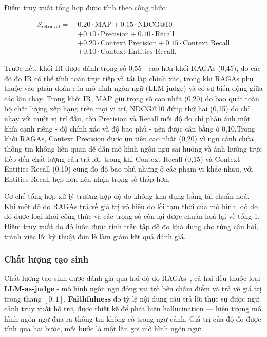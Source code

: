 Điểm truy xuất tổng hợp được tính theo công thức:

\begin{equation}
\begin{aligned}
S_{\text{retrieval}} =\;& 0.20 \cdot \text{MAP}
  + 0.15 \cdot \text{NDCG@10} \\
& + 0.10 \cdot \text{Precision}
  + 0.10 \cdot \text{Recall} \\
& + 0.20 \cdot \text{Context Precision}
  + 0.15 \cdot \text{Context Recall} \\
& + 0.10 \cdot \text{Context Entities Recall}.
\end{aligned}
\end{equation}

Trước hết, khối IR được đánh trọng số 0,55 - cao hơn khối RAGAs (0,45), do các độ đo IR có thể tính toán trực tiếp và tái lập chính xác, trong khi RAGAs phụ thuộc vào phán đoán của mô hình ngôn ngữ (LLM-judge) và có sự biến động giữa các lần chạy. Trong khối IR, MAP giữ trọng số cao nhất (0,20) do bao quát toàn bộ chất lượng xếp hạng trên mọi vị trí, NDCG@10 đứng thứ hai (0,15) do chỉ nhạy với mười vị trí đầu, còn Precision và Recall mỗi độ đo chỉ phản ánh một khía cạnh riêng - độ chính xác và độ bao phủ - nên được cân bằng ở 0,10.Trong khối RAGAs, Context Precision được ưu tiên cao nhất (0,20) vì ngữ cảnh chứa thông tin không liên quan dễ dẫn mô hình ngôn ngữ sai hướng và ảnh hưởng trực tiếp đến chất lượng câu trả lời, trong khi Context Recall (0,15) và Context Entities Recall (0,10) cùng đo độ bao phủ nhưng ở các phạm vi khác nhau, với Entities Recall hẹp hơn nên nhận trọng số thấp hơn.

Cơ chế tổng hợp xử lý trường hợp độ đo không khả dụng bằng tái chuẩn hoá. Khi một độ đo RAGAs trả về giá trị vô hiệu do lỗi tạm thời của mô hình, độ đo đó được loại khỏi công thức và các trọng số còn lại được chuẩn hoá lại về tổng 1. Điểm truy xuất do đó luôn được tính trên tập độ đo khả dụng cho từng câu hỏi, tránh việc lỗi kỹ thuật đơn lẻ làm giảm kết quả đánh giá.

\subsubsection{Chất lượng tạo sinh}

Chất lượng tạo sinh được đánh giá qua hai độ đo RAGAs~\cite{es2023ragas}, cả hai đều thuộc loại \textbf{LLM-as-judge} - mô hình ngôn ngữ đóng vai trò bên chấm điểm và trả về giá trị trong thang $[0, 1]$. \textbf{Faithfulness} đo tỷ lệ nội dung câu trả lời thực sự được ngữ cảnh truy xuất hỗ trợ, được thiết kế để phát hiện hallucination --- hiện tượng mô hình ngôn ngữ đưa ra thông tin không có trong ngữ cảnh. Giá trị của độ đo được tính qua hai bước, mỗi bước là một lần gọi mô hình ngôn ngữ:

